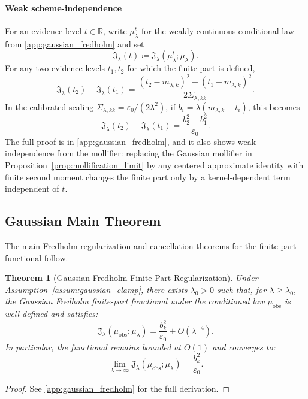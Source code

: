 \documentclass[preprint,12pt]{elsarticle}
\theoremstyle{plain}
\newtheorem{theorem}{Theorem}
\theoremstyle{definition}
\theoremstyle{remark}
\begin{document}
    \paragraph{Weak scheme-independence}
    For an evidence level $t\in\mathbb{R}$, write $\mu_\lambda^t$ for the weakly continuous conditional law from \ref{app:gaussian_fredholm} and set
    \[
    \mathfrak{J}_\lambda(t)\coloneqq
    \mathfrak{J}_\lambda(\mu_\lambda^t;\mu_\lambda).
    \]
    For any two evidence levels $t_1,t_2$ for which the finite part is defined,
    \begin{equation}
        \label{eq:weak_scheme_independence}
        \mathfrak{J}_\lambda(t_2)-\mathfrak{J}_\lambda(t_1)
        =
        \frac{(t_2-m_{\lambda,k})^2-(t_1-m_{\lambda,k})^2}
        {2\Sigma_{\lambda,kk}}.
    \end{equation}
    In the calibrated scaling $\Sigma_{\lambda,kk}=\varepsilon_0/(2\lambda^2)$, if
    $b_i=\lambda(m_{\lambda,k}-t_i)$, this becomes
    \[
    \mathfrak{J}_\lambda(t_2)-\mathfrak{J}_\lambda(t_1)
    =
    \frac{b_2^2-b_1^2}{\varepsilon_0}.
    \]
    The full proof is in \ref{app:gaussian_fredholm}, and it also shows
    weak-independence from the mollifier: replacing the Gaussian mollifier in
    Proposition~\ref{prop:mollification_limit} by any centered approximate identity with
    finite second moment changes the finite part only by a kernel-dependent term
    independent of $t$.

    \subsection{Gaussian Main Theorem}
    \label{sec:gaussian:theorem}

    The main Fredholm regularization and cancellation theorems for the finite-part functional follow.

    \begin{theorem}[Gaussian Fredholm Finite-Part Regularization]
        \label{thm:finite_part_regularization}
        Under Assumption~\ref{assum:gaussian_clamp}, there exists $\lambda_0>0$ such that, for $\lambda\ge\lambda_0$, the Gaussian Fredholm finite-part functional under the conditioned law $\mu_{\mathrm{obs}}$ is well-defined and satisfies:
        \begin{equation}
            \label{eq:unified_regularization}
            \mathfrak{J}_\lambda(\mu_{\mathrm{obs}}; \mu_\lambda) = \frac{b_k^2}{\varepsilon_0} + O(\lambda^{-4}).
        \end{equation}
        In particular, the functional remains bounded at $O(1)$ and converges to:
        \begin{equation}
            \lim_{\lambda\to\infty} \mathfrak{J}_\lambda(\mu_{\mathrm{obs}}; \mu_\lambda) = \frac{b_k^2}{\varepsilon_0}.
        \end{equation}
    \end{theorem}
    \begin{proof}
        See \ref{app:gaussian_fredholm} for the full derivation.
    \end{proof}
\end{document}
